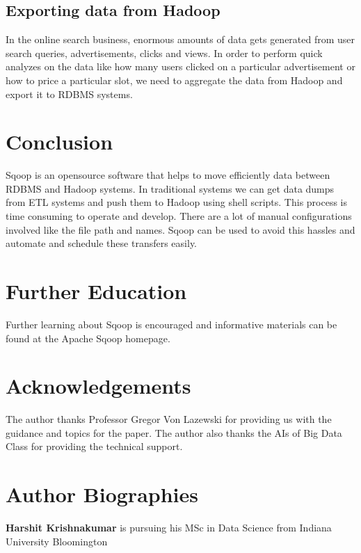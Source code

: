 \documentclass[9pt,twocolumn,twoside]{../../styles/osajnl}
\begin{document}
\subsection{Exporting data from Hadoop}
In the online search business, enormous amounts of data gets generated from user search queries, advertisements, clicks and views. In order to perform quick analyzes on the data like how many users clicked on a particular advertisement or how to price a particular slot, we need to aggregate the data from Hadoop and export it to RDBMS systems. 

\section{Conclusion}
Sqoop is an opensource software that helps to move efficiently data between RDBMS and Hadoop systems. In traditional systems we can get data dumps from ETL systems and push them to Hadoop using shell scripts. This process is time consuming to operate and develop. There are a lot of manual configurations involved like the file path and names. Sqoop can be used to avoid this hassles and automate and schedule these transfers easily. 

\section{Further Education}
Further learning about Sqoop is encouraged and informative materials can be found at the Apache Sqoop homepage\cite{pages}.

\section*{Acknowledgements}

The author thanks Professor Gregor Von Lazewski for providing us with the guidance and topics for the paper. The author also thanks the AIs of Big Data Class for providing the technical
support.




 
\section*{Author Biographies}
\begingroup
\setlength\intextsep{0pt}
\begin{minipage}[t][3.2cm][t]{1.0\columnwidth} %
{\bfseries Harshit Krishnakumar} is pursuing his MSc in Data Science from
Indiana University Bloomington
\end{minipage}
\endgroup
\end{document}
